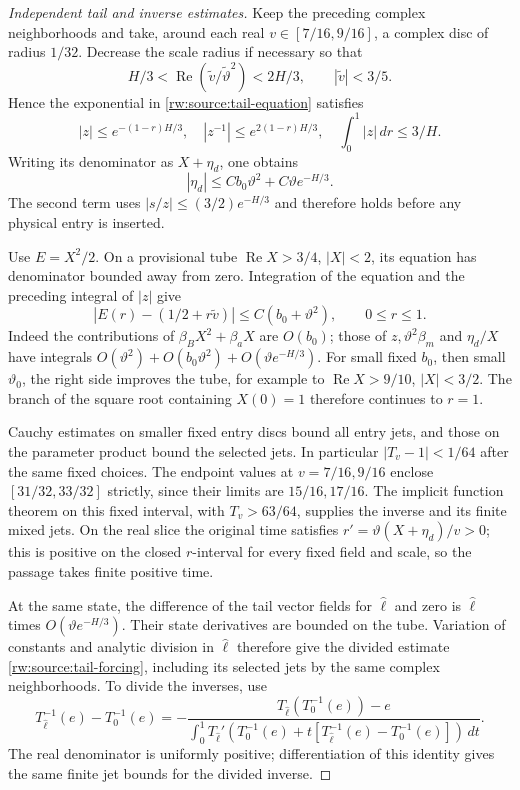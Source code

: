 \begin{proof}[Independent tail and inverse estimates]
Keep the preceding complex neighborhoods and take, around each real
$v\in[7/16,9/16]$, a complex disc of radius $1/32$.
Decrease the scale radius if necessary so that
\[
 H/3<\operatorname{Re}(\widetilde v/\widetilde\vartheta^2)<2H/3,
 \qquad |\widetilde v|<3/5.
\]
Hence the exponential in \eqref{rw:source:tail-equation} satisfies
\[
 |z|\le e^{-(1-r)H/3},\quad
 |z^{-1}|\le e^{2(1-r)H/3},\quad
 \int_0^1|z|\,dr\le3/H.
\]
Writing its denominator as $X+\eta_d$, one obtains
\[
 |\eta_d|\le Cb_0\vartheta^2+C\vartheta e^{-H/3}.
\]
The second term uses $|s/z|\le(3/2)e^{-H/3}$ and therefore
holds before any physical entry is inserted.

Use $E=X^2/2$. On a provisional tube
$\operatorname{Re}X>3/4$, $|X|<2$, its equation has denominator
bounded away from zero. Integration of the equation and the preceding
integral of $|z|$ give
\[
 |E(r)-(1/2+r\widetilde v)|\le C(b_0+\vartheta^2),
 \qquad 0\le r\le1.
\]
Indeed the contributions of $\beta_BX^2+\beta_aX$ are $O(b_0)$;
those of $z,\vartheta^2\beta_m$ and $\eta_d/X$ have integrals
$O(\vartheta^2)+O(b_0\vartheta^2)+O(\vartheta e^{-H/3})$.
For small fixed $b_0$, then small $\vartheta_0$, the right side
improves the tube, for example to $\operatorname{Re}X>9/10$,
$|X|<3/2$. The branch of the square root containing $X(0)=1$
therefore continues to $r=1$.

Cauchy estimates on smaller fixed entry discs bound all entry jets,
and those on the parameter product bound the selected jets. In
particular $|T_v-1|<1/64$ after the same fixed choices. The endpoint
values at $v=7/16,9/16$ enclose $[31/32,33/32]$ strictly, since
their limits are $15/16,17/16$. The implicit function theorem on
this fixed interval, with $T_v>63/64$, supplies the inverse and its
finite mixed jets. On the real slice the original time satisfies
$r'=\vartheta(X+\eta_d)/v>0$; this is positive on the closed
$r$-interval for every fixed field and scale, so the passage takes
finite positive time.

At the same state, the difference of the tail vector fields for
$\widehat\ell$ and zero is $\widehat\ell$ times
$O(\vartheta e^{-H/3})$. Their state derivatives are bounded on
the tube. Variation of constants and analytic division in $\widehat\ell$
therefore give the divided estimate
\eqref{rw:source:tail-forcing}, including its selected jets by the
same complex neighborhoods. To divide the inverses, use
\[
 T_{\widehat\ell}^{-1}(e)-T_0^{-1}(e)
 =-\frac{T_{\widehat\ell}(T_0^{-1}(e))-e}
 {\displaystyle\int_0^1T_{\widehat\ell}'
       (T_0^{-1}(e)+t[T_{\widehat\ell}^{-1}(e)-T_0^{-1}(e)])\,dt}.
\]
The real denominator is uniformly positive; differentiation of this
identity gives the same finite jet bounds for the divided inverse.
\end{proof}

